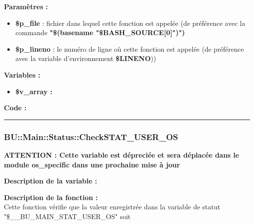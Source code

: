 \documentclass[a4paper,10pt]{article}
\begin{document}
\begin{justify}
    \textbf{Paramètres :}

    \begin{itemize}
        \item \color{orange}\textbf{\$p\_file}\color{white} : fichier dans lequel cette fonction est appelée (de préférence avec la commande \textbf{"\$(\color{gray}basename \color{white}"\color{orange}\$BASH\_SOURCE[0]\color{white}")")}\\

        \item \color{orange}\textbf{\$p\_lineno}\color{white} : le numéro de ligne où cette fonction est appelée (de préférence avec la variable d'environnement \textbf{\color{orange}\$LINENO}))
    \end{itemize}
\end{justify}

\begin{justify}
    \textbf{Variables :}

    \begin{itemize}
        \item \textbf{\color{orange}\$v\_array\color{white} :}
    \end{itemize}
\end{justify}

\begin{justify}
    \textbf{Code :}
\end{justify}



\color{blue}\par\noindent\rule{\textwidth}{0.4pt}\color{white}

\color{blue}
\subsubsection{\color{mauve}BU::Main::Status::CheckSTAT\_USER\_OS}\color{white}

\textbf{ATTENTION : Cette variable est dépreciée et sera déplacée dans le module \textbf{\color{lime}os\_specific} dans une prochaine mise à jour}

\begin{justify}
    \textbf{Description de la variable :}\\
    
\end{justify}

\begin{justify}
    \textbf{Description de la fonction :}\\
    Cette fonction vérifie que la valeur enregistrée dans la variable de statut "\$\_\_BU\_MAIN\_STAT\_USER\_OS" soit
\end{justify}
\end{document}
